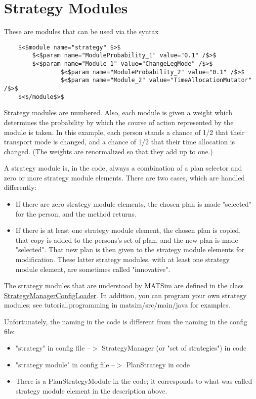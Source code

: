 \documentclass[a4paper,11pt]{report}
\begin{document}
\chapter{Strategy Modules}


These are modules that can be used via the syntax
\begin{verbatim}
	$<$module name="strategy" $>$
		$<$param name="ModuleProbability_1" value="0.1" /$>$
		$<$param name="Module_1" value="ChangeLegMode" /$>$
                $<$param name="ModuleProbability_2" value="0.1" /$>$
                $<$param name="Module_2" value="TimeAllocationMutator" /$>$
	$<$/module$>$
\end{verbatim}


Strategy modules are numbered. Also, each  module is given a weight which determines the probability by which the  course of action represented by the module is taken. In this example,  each person stands a chance of 1/2 that their transport mode is changed,  and a chance of 1/2 that their time allocation is changed. (The  weights are renormalized so that they add up to one.)

A strategy module is, in the code, always a combination of a plan  selector and zero or more strategy module elements. There are two cases,  which are handled differently:
\begin{itemize}
	\item If there are zero strategy module elements, the chosen plan is made "selected" for the person, and the method returns.
	\item If there is at least one strategy module element, the chosen plan is  copied, that copy is added to the persons's set of plan, and the new  plan is made "selected". That new plan is then given to the  strategy module elements for modification. These latter strategy  modules, with at least one strategy module element, are sometimes called  "innovative".
\end{itemize}

The strategy modules that are understood by MATSim are defined in the class \href{http://www.matsim.org/xref/org/matsim/core/replanning/StrategyManagerConfigLoader.html}{StrategyManagerConfigLoader}. In addition, you can program your own strategy modules; see tutorial.programming in matsim/src/main/java for examples.

Unfortunately, the naming in the code is different from the naming in the config file:
\begin{itemize}
	\item "strategy" in config file --$>$ StrategyManager (or "set of strategies") in code
	\item "strategy module" in config file --$>$ PlanStrategy in code
	\item There is a PlanStrategyModule in the code; it corresponds to what was called strategy module element in the description above.
\end{itemize}
\end{document}
